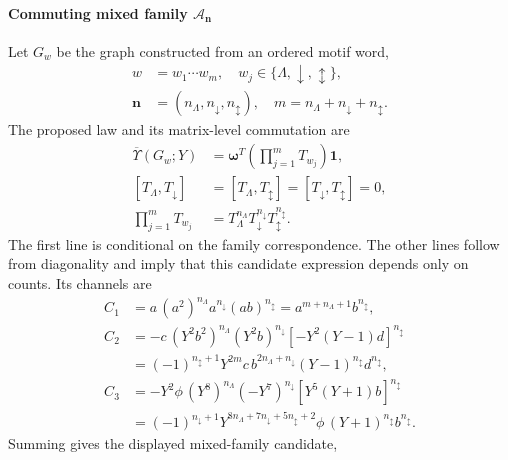 \documentclass[10pt,twocolumn]{article}
\begin{document}
\paragraph{Commuting mixed family $\mathcal A_{\mathbf n}$}
\label{supp:transfer_abelian_mixed}
Let $G_w$ be the graph constructed from an ordered motif word,
\begin{equation}
\begin{aligned}
w&=w_1\cdots w_m,\quad w_j\in\{\Lambda,\downarrow,\updownarrow\},\\
\mathbf n&=(n_\Lambda,n_\downarrow,n_\updownarrow),\quad m=n_\Lambda+n_\downarrow+n_\updownarrow.
\end{aligned}
\label{supp:deriv:eq:mixed_word_counts}
\end{equation}
The proposed law and its matrix-level commutation are
\begin{equation}
\begin{aligned}
\overline{\Upsilon}(G_w;Y)&=\bm\omega^T\!\left(\prod_{j=1}^mT_{w_j}\right)\!\bm1,\\
[T_\Lambda,T_\downarrow]&=[T_\Lambda,T_\updownarrow]=[T_\downarrow,T_\updownarrow]=0,\\
\prod_{j=1}^mT_{w_j}&=T_\Lambda^{n_\Lambda}T_\downarrow^{n_\downarrow}T_\updownarrow^{n_\updownarrow}.
\end{aligned}
\label{supp:deriv:eq:mixed_commuting_transfer}
\end{equation}
The first line is conditional on the family correspondence. The other lines follow from diagonality and imply that this candidate expression depends only on counts. Its channels are
\begin{equation}
\begin{aligned}
C_1&=a\,(a^2)^{n_\Lambda}a^{n_\downarrow}(ab)^{n_\updownarrow}
=a^{m+n_\Lambda+1}b^{n_\updownarrow},\\
C_2&=-c\,(Y^2b^2)^{n_\Lambda}(Y^2b)^{n_\downarrow}[-Y^2(Y-1)d]^{n_\updownarrow}\\
&=(-1)^{n_\updownarrow+1}Y^{2m}c\,b^{2n_\Lambda+n_\downarrow}(Y-1)^{n_\updownarrow}d^{n_\updownarrow},\\
C_3&=-Y^2\phi\,(Y^8)^{n_\Lambda}(-Y^7)^{n_\downarrow}[Y^5(Y+1)b]^{n_\updownarrow}\\
&=(-1)^{n_\downarrow+1}Y^{8n_\Lambda+7n_\downarrow+5n_\updownarrow+2}\phi\,(Y+1)^{n_\updownarrow}b^{n_\updownarrow}.
\end{aligned}
\label{supp:deriv:eq:mixed_channels}
\end{equation}
Summing gives the displayed mixed-family candidate,
\end{document}
